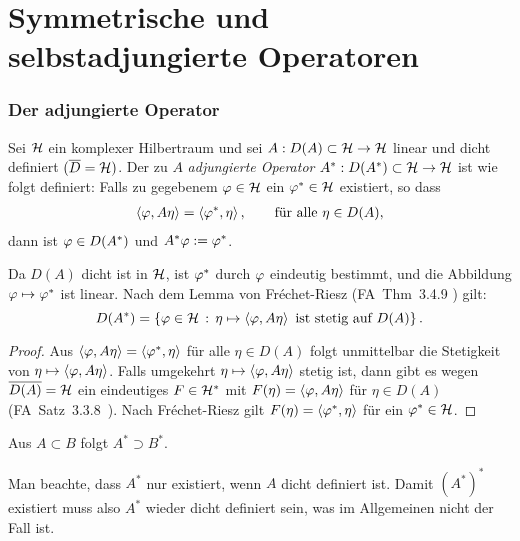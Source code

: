\chapter{Symmetrische und selbstadjungierte Operatoren}
\renewcommand{\bar}[1]{\overline{#1}}

\subsection{Der adjungierte Operator}

\begin{defn*}
Sei $\mathcal{H}$ ein komplexer Hilbertraum und sei $A : D(A) \subset \mathcal{H} \to \mathcal{H}$
linear und dicht definiert $(\bar{D} = \HH)$. Der zu $A$ \emph{adjungierte
Operator}
$A^{*} : D(A^{*}) \subset \mathcal{H} \to \mathcal{H}$ ist wie folgt definiert:
Falls zu gegebenem $\varphi \in \mathcal{H}$ ein $\varphi^{*} \in \mathcal{H}$ existiert,
so dass
\begin{align*}
\left\langle\varphi,A\eta\right\rangle = \left\langle\varphi^{*},\eta\right\rangle, \qquad \text{für alle}\ \eta\in D(A),
\end{align*}
dann ist  $\varphi \in D(A^{*})$ und $A^{*}\varphi := \varphi^{*}$.\fishhere
\end{defn*}

Da $D(A)$ dicht ist in $\mathcal{H}$, ist $\varphi^{*}$ durch $\varphi$ eindeutig bestimmt,
und die Abbildung $\varphi \mapsto \varphi^{*}$ ist linear.
Nach dem Lemma von Fréchet-Riesz (FA~Thm~3.4.9 \cite{Fun07}) gilt:
\[
   D(A^{*}) = \left\{ \varphi\in\mathcal{H}\,:\,\eta \mapsto \left\langle\varphi,A\eta\right\rangle
\text{ ist stetig auf } D(A)\right\}.
\]
\begin{proof}
Aus $\left\langle\varphi,A\eta\right\rangle = \left\langle\varphi^{*},\eta\right\rangle$ f\"ur alle
$\eta \in D(A)$ folgt unmittelbar die Stetigkeit von $\eta \mapsto
\left\langle\varphi,A\eta\right\rangle$.
Falls umgekehrt $\eta \mapsto \left\langle\varphi,A\eta\right\rangle$ stetig ist,
dann gibt es wegen $\overline{D(A)} = \mathcal{H}$ ein eindeutiges
$F \in \mathcal{H}^{*}$ mit $F(\eta) = \left\langle\varphi,A\eta\right\rangle$
für $\eta \in D(A)$ (FA~Satz~3.3.8~\cite{Fun07}).
Nach Fréchet-Riesz gilt $F(\eta) = \left\langle\varphi^{*},\eta\right\rangle$
für ein $\varphi^{*} \in \mathcal{H}$.\qedhere
\end{proof}

\begin{bem*}
Aus $A \subset B$ folgt $A^{*} \supset B^{*}$.

Man beachte, dass $A^*$ nur existiert, wenn $A$ dicht definiert ist.
Damit $(A^*)^*$ existiert muss also $A^*$ wieder dicht definiert sein,
was im Allgemeinen nicht der Fall ist.~\maphere
\end{bem*}


